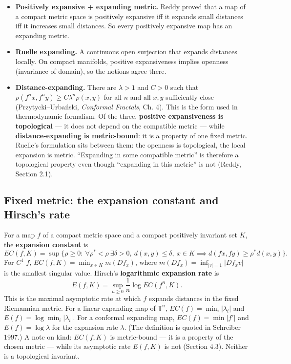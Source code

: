 \documentclass[
]{article}
\providecommand{\tightlist}{%
  \setlength{\itemsep}{0pt}\setlength{\parskip}{0pt}}
\begin{document}
\begin{itemize}
\tightlist
\item
  \textbf{Positively expansive + expanding metric.} Reddy proved that a
  map of a compact metric space is positively expansive iff it expands
  small distances iff it increases small distances. So every positively
  expansive map has an expanding metric.
\item
  \textbf{Ruelle expanding.} A continuous open surjection that expands
  distances locally. On compact manifolds, positive expansiveness
  implies openness (invariance of domain), so the notions agree there.
\item
  \textbf{Distance-expanding.} There are \(\lambda>1\) and \(C>0\) such
  that \(\rho(f^n x,f^n y)\ge C\lambda^n\rho(x,y)\) for all \(n\) and
  all \(x,y\) sufficiently close (Przytycki--Urba\'{n}ski,
  \emph{Conformal Fractals}, Ch. 4). This is the form used in
  thermodynamic formalism. Of the three, \textbf{positive expansiveness
  is topological} --- it does not depend on the compatible metric ---
  while \textbf{distance-expanding is metric-bound}: it is a property of
  one fixed metric. Ruelle's formulation sits between them: the openness
  is topological, the local expansion is metric. ``Expanding in some
  compatible metric'' is therefore a topological property even though
  ``expanding in this metric'' is not (Reddy, Section 2.1).
\end{itemize}

\subsection{Fixed metric: the expansion constant and Hirsch's
rate}\label{fixed-metric-the-expansion-constant-and-hirschs-rate}

For a map \(f\) of a compact metric space and a compact positively
invariant set \(K\), the \textbf{expansion constant} is \[
EC(f,K)=\sup\{\rho\ge0:\ \forall \rho^*<\rho\ \exists\delta>0,\ d(x,y)\le\delta,\ x\in K\implies d(fx,fy)\ge\rho^*d(x,y)\}.
\] For \(C^1\) \(f\), \(EC(f,K)=\min_{x\in K}m(Df_x)\), where
\(m(Df_x)=\inf_{|v|=1}|Df_xv|\) is the smallest singular value. Hirsch's
\textbf{logarithmic expansion rate} is \[
E(f,K)=\sup_{n\ge0}\frac1n\log EC(f^n,K).
\] This is the maximal asymptotic rate at which \(f\) expands distances
in the fixed Riemannian metric. For a linear expanding map of
\(\mathbb T^n\), \(EC(f)=\min_i|\lambda_i|\) and
\(E(f)=\log\min_i|\lambda_i|\). For a conformal expanding map,
\(EC(f)=\min|f'|\) and \(E(f)=\log\lambda\) for the expansion rate
\(\lambda\). (The definition is quoted in Schreiber 1997.) A note on
kind: \(EC(f,K)\) is metric-bound --- it is a property of the chosen
metric --- while its asymptotic rate \(E(f,K)\) is not (Section 4.3).
Neither is a topological invariant.
\end{document}
